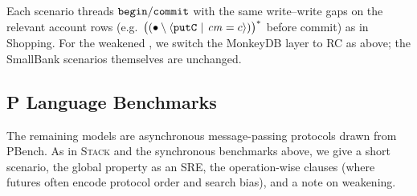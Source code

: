 \vspace{-.35cm}\par{}
\vspace{-.4cm}\par\nobreak\noindent
Each scenario threads \(\boldsymbol{{\tt begin}}/\boldsymbol{{\tt commit}}\) with the same write--write gaps on the relevant account rows (e.g.\ \({\bigl((\bullet \setminus {   {\langle} {\boldsymbol{{\tt putC}}~|~{\mathit{cm}=c}}  {\rangle} })\bigr)^{\ast}}\) before commit) as in \textsf{Shopping}. For the weakened \tyName{}, we switch the MonkeyDB layer to RC as above; the SmallBank scenarios themselves are unchanged.

\subsection*{P Language Benchmarks}
The remaining models are asynchronous message-passing protocols drawn from PBench. As in \textsc{Stack} and the synchronous benchmarks above, we give a short scenario, the global property as an SRE, the operation-wise \tyName{} clauses (where futures often encode protocol order and search bias), and a note on weakening.


